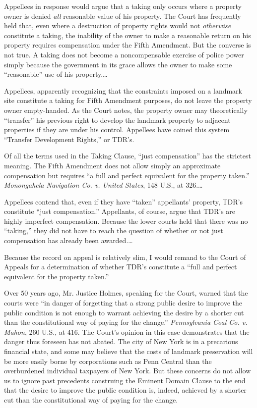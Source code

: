 Appellees in response would argue that a taking only occurs where a property
owner is denied \textit{all} reasonable value of his property. The Court has
frequently held that, even where a destruction of property rights would not
\textit{otherwise} constitute a taking, the inability of the owner to make a
reasonable return on his property requires compensation under the Fifth
Amendment. But the converse is not true. A taking does not become a
noncompensable exercise of police power simply because the government in its
grace allows the owner to make some ``reasonable'' use of his property.\ldots



Appellees, apparently recognizing that the constraints imposed on a landmark
site constitute a taking for Fifth Amendment purposes, do not leave the property
owner empty-handed. As the Court notes, the property owner may theoretically
``transfer'' his previous right to develop the landmark property to adjacent
properties if they are under his control. Appellees have coined this system
``Transfer Development Rights,'' or TDR's.

Of all the terms used in the Taking Clause, ``just compensation'' has the
strictest meaning. The Fifth Amendment does not allow simply an approximate
compensation but requires ``a full and perfect equivalent for the property
taken.'' \textit{Monongahela Navigation Co. v. United States}, 148 U.S., at
326.\ldots

Appellees contend that, even if they have ``taken'' appellants' property, TDR's
constitute ``just compensation.'' Appellants, of course, argue that TDR's are
highly imperfect compensation. Because the lower courts held that there was no
``taking,'' they did not have to reach the question of whether or not just
compensation has already been awarded.\ldots

Because the record on appeal is relatively slim, I would remand to the Court of
Appeals for a determination of whether TDR's constitute a ``full and perfect
equivalent for the property taken.''



Over 50 years ago, Mr. Justice Holmes, speaking for the Court, warned that the
courts were ``in danger of forgetting that a strong public desire to improve the
public condition is not enough to warrant achieving the desire by a shorter cut
than the constitutional way of paying for the change.'' \textit{Pennsylvania
Coal Co. v. Mahon}, 260 U.S., at 416. The Court's opinion in this case
demonstrates that the danger thus foreseen has not abated. The city of New York
is in a precarious financial state, and some may believe that the costs of
landmark preservation will be more easily borne by corporations such as Penn
Central than the overburdened individual taxpayers of New York. But these
concerns do not allow us to ignore past precedents construing the Eminent Domain
Clause to the end that the desire to improve the public condition is, indeed,
achieved by a shorter cut than the constitutional way of paying for the change.

